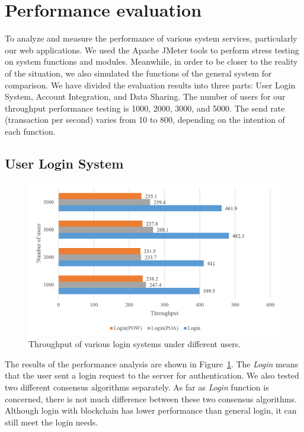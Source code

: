 \section{Performance evaluation}
To analyze and measure the performance of various system services, particularly our web applications. We used the Apache JMeter tools to perform stress testing on system functions and modules. Meanwhile, in order to be closer to the reality of the situation, we also simulated the functions of the general system for comparison. We have divided the evaluation results into three parts: User Login System, Account Integration, and Data Sharing. The number of users for our throughput performance testing is 1000, 2000, 3000, and 5000. The send rate (transaction per second) varies from 10 to 800, depending on the intention of each function.
\subsection*{User Login System}
\begin{figure}[htb]
    \centering
    \includegraphics[height=!,width=0.9\linewidth,keepaspectratio=true]{figures/login-throughput.png}
    \caption{{\footnotesize Throughput of various login systems under different users.}}
    \label{fig:loginThroughput}
\end{figure}
The results of the performance analysis are shown in Figure~\ref{fig:loginThroughput}. The \textit{Login} means that the user sent a login request to the server for authentication. We also tested two different consensus algorithms separately. As far as \textit{Login} function is concerned, there is not much difference between these two consensus algorithms. Although login with blockchain has lower performance than general login, it can still meet the login needs.
\newpage

